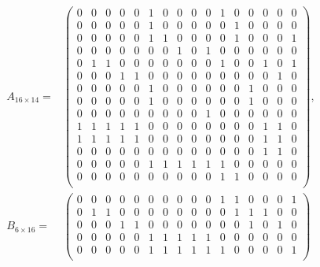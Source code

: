 \begin{frame}
    \tiny
    \begin{equation*}
        \begin{split}
        A_{16\times14} = &\begin{pmatrix}
            0 & 0 & 0 & 0 & 0 & 1 & 0 & 0 & 0 & 0 & 1 & 0 & 0 & 0 & 0 & 0 \\
            0 & 0 & 0 & 0 & 0 & 1 & 0 & 0 & 0 & 0 & 0 & 1 & 0 & 0 & 0 & 0 \\
            0 & 0 & 0 & 0 & 0 & 1 & 1 & 0 & 0 & 0 & 0 & 1 & 0 & 0 & 0 & 1 \\
            0 & 0 & 0 & 0 & 0 & 0 & 0 & 1 & 0 & 1 & 0 & 0 & 0 & 0 & 0 & 0 \\
            0 & 1 & 1 & 0 & 0 & 0 & 0 & 0 & 0 & 0 & 1 & 0 & 0 & 1 & 0 & 1 \\
            0 & 0 & 0 & 1 & 1 & 0 & 0 & 0 & 0 & 0 & 0 & 0 & 0 & 0 & 1 & 0 \\
            0 & 0 & 0 & 0 & 0 & 1 & 0 & 0 & 0 & 0 & 0 & 0 & 1 & 0 & 0 & 0 \\
            0 & 0 & 0 & 0 & 0 & 1 & 0 & 0 & 0 & 0 & 0 & 0 & 1 & 0 & 0 & 0 \\
            0 & 0 & 0 & 0 & 0 & 0 & 0 & 0 & 0 & 1 & 0 & 0 & 0 & 0 & 0 & 0 \\
            1 & 1 & 1 & 1 & 1 & 0 & 0 & 0 & 0 & 0 & 0 & 0 & 0 & 1 & 1 & 0 \\
            1 & 1 & 1 & 1 & 1 & 0 & 0 & 0 & 0 & 0 & 0 & 0 & 0 & 1 & 1 & 0 \\
            0 & 0 & 0 & 0 & 0 & 0 & 0 & 0 & 0 & 0 & 0 & 0 & 0 & 1 & 1 & 0 \\
            0 & 0 & 0 & 0 & 0 & 1 & 1 & 1 & 1 & 1 & 1 & 0 & 0 & 0 & 0 & 0 \\
            0 & 0 & 0 & 0 & 0 & 0 & 0 & 0 & 0 & 0 & 1 & 1 & 0 & 0 & 0 & 0 \\
        \end{pmatrix},{}\\
        B_{6\times16} = &\begin{pmatrix}
            0 & 0 & 0 & 0 & 0 & 0 & 0 & 0 & 0 & 0 & 1 & 1 & 0 & 0 & 0 & 1 \\
            0 & 1 & 1 & 0 & 0 & 0 & 0 & 0 & 0 & 0 & 0 & 1 & 1 & 1 & 0 & 0 \\
            0 & 0 & 0 & 1 & 1 & 0 & 0 & 0 & 0 & 0 & 0 & 0 & 1 & 0 & 1 & 0 \\
            0 & 0 & 0 & 0 & 0 & 1 & 1 & 1 & 1 & 1 & 0 & 0 & 0 & 0 & 0 & 0 \\
            0 & 0 & 0 & 0 & 0 & 1 & 1 & 1 & 1 & 1 & 1 & 0 & 0 & 0 & 0 & 1 \\

\end{pmatrix}
\end{split}
\end{equation*}
\end{frame}
